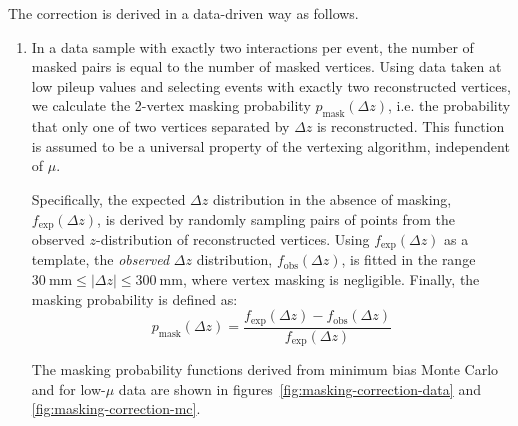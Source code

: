 The correction is derived in a data-driven way as follows. 
\begin{enumerate}
	\item In a data sample with exactly two interactions per event, the number of masked pairs is equal to the number of masked vertices. Using data taken at low pileup values and selecting events with exactly two reconstructed vertices, we calculate the 2-vertex masking probability $p_{\textrm{mask}}(\Delta z)$, i.e. the probability that only one of two vertices separated by $\Delta z$ is reconstructed. This function is assumed to be a universal property of the vertexing algorithm, independent of $\mu$. 
	
	Specifically, the expected $\Delta z$ distribution in the absence of masking, $f_{\mathrm{exp}}(\Delta z)$, is derived by randomly sampling pairs of points from the observed $z$-distribution of reconstructed vertices. Using $f_{\mathrm{exp}}(\Delta z)$ as a template, the \emph{observed} $\Delta z$ distribution, $f_{\mathrm{obs}}(\Delta z)$, is fitted in the range $\SI{30}{\milli\meter}\leq|\Delta z| \leq \SI{300}{\milli\meter}$, where vertex masking is negligible. Finally, the masking probability is defined as:
	\begin{equation}
		p_{\textrm{mask}}(\Delta z) = \frac{f_{\mathrm{exp}}(\Delta z) - f_{\mathrm{obs}}(\Delta z)}{f_{\mathrm{exp}}(\Delta z)}
	\end{equation}
	
	The masking probability functions derived from minimum bias Monte Carlo and for low-$\mu$ data are shown in figures~\ref{fig:masking-correction-data} and \ref{fig:masking-correction-mc}.
		

\end{enumerate}
